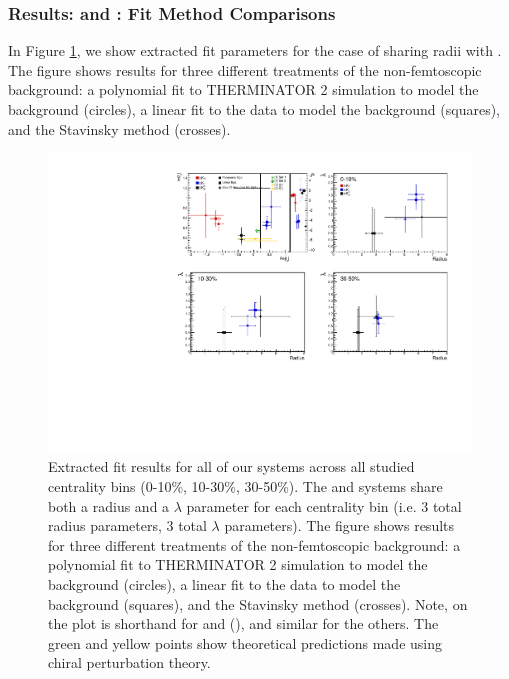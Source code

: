 \documentclass[../AnalysisNoteJBuxton.tex]{subfiles}
\begin{document}
\subsubsection{Results: \LamKs and \LamKpm: Fit Method Comparisons}
\label{ResultsLamK_FitMethComp}

In Figure \ref{fig:FitResults_ShareR_Sharelam_PolyBgd}, we show extracted fit parameters for the case of \LamKchPALamKchM sharing radii with \LamKchMALamKchP.  The figure shows results for three different treatments of the non-femtoscopic background: a polynomial fit to THERMINATOR 2 simulation to model the background (circles), a linear fit to the data to model the background (squares), and the Stavinsky method (crosses).


\begin{figure}[h]
  \centering
  \includegraphics[width=\textwidth]{7_ResultsAndDiscussion/Figures/CompareAllScattParams_CompBgdTreatment_StatOnly.pdf}
  \caption[Fit Results: Shared Radii and THERMINATOR 2 Background]{Extracted fit results for all of our \LamALamKpm systems across all studied centrality bins (0-10\%, 10-30\%, 30-50\%).  The \LamKchPALamKchM and \LamKchMALamKchP systems share both a radius and a $\lambda$ parameter for each centrality bin (i.e. 3 total radius parameters, 3 total $\lambda$ parameters).  The figure shows results for three different treatments of the non-femtoscopic background: a polynomial fit to THERMINATOR 2 simulation to model the background (circles), a linear fit to the data to model the background (squares), and the Stavinsky method (crosses).  Note, \LamKchP on the plot is shorthand for \LamKchP and \ALamKchM (\LamKchPALamKchM), and similar for the others.  The green \cite{Liu:2006xja} and yellow \cite{Mai:2009ce} points show theoretical predictions made using chiral perturbation theory.}
  \label{fig:FitResults_ShareR_Sharelam_PolyBgd}
\end{figure}
\end{document}
